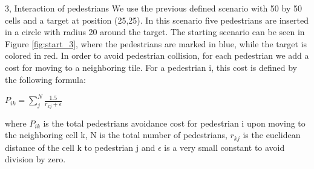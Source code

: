 \documentclass[10pt,a4paper]{article}
\begin{document}
\begin{task}{3, Interaction of pedestrians}
We use the previous defined scenario with 50 by 50 cells and a target at position (25,25). In this scenario five pedestrians are inserted in a circle with radius 20 around the target. The starting scenario can be seen in Figure \ref{fig:start_3}, where the pedestrians are marked in blue, while the target is colored in red.
In order to avoid pedestrian collision, for each pedestrian we add a cost for moving to a neighboring tile. For a pedestrian i, this cost is defined by the following formula: \\

\begin{center}
$P_{ik} = \sum_{j}^{N} \frac{1.5}{r_{kj} + \epsilon }$
\end{center}


where $P_{ik}$ is the total pedestrians avoidance cost for pedestrian i upon moving to the neighboring cell k, N is the total number of pedestrians, $r_{kj}$ is the euclidean distance of the cell k to pedestrian j and $\epsilon$ is a very small constant to avoid division by zero. 


\end{task}
\end{document}
